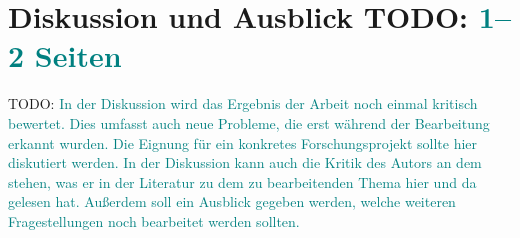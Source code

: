 \documentclass[headsepline,titlepage,ngerman,twoside,12pt]{report}
\newcommand\todo[1]{TODO: \textcolor{teal}{#1}}
\begin{document}
\chapter{Diskussion und Ausblick \todo{1--2 Seiten}}
\todo{
In der Diskussion wird das Ergebnis der Arbeit noch einmal kritisch bewertet.
Dies umfasst auch neue Probleme, die erst während der Bearbeitung erkannt wurden.
Die Eignung für ein konkretes Forschungsprojekt sollte hier diskutiert werden.
In der Diskussion kann auch die Kritik des Autors an dem stehen, was er in der Literatur zu dem zu bearbeitenden Thema hier und da gelesen hat.
Außerdem soll ein Ausblick gegeben werden, welche weiteren Fragestellungen noch bearbeitet werden sollten.
}

\renewcommand{\bibpreamble}{
\todo{
Zentrale Literatur, die den untersuchten Artikeln zugrunde liegt, können Sie im bibtex-Format in die seminar.bib einfügen und dann im Text zitieren, wodurch diese automatisch in das Literaturverzeichnis übernommen werden.
Sie können auch weitere referierte Veröffentlichungen (wissenschaftliche Zeitschriften (auch elektronisch), Bücher) in die Erarbeitung einbeziehen zitieren.
Sie können dafür Literaturdatenbanken wie Pubmed oder Google Scholar durchsuchen und dort direkt als bibtex-Eintrag herunterladen.
Bitte beachten Sie, dass die \href{https://www.openoffice.org/bibliographic/bibtex-defs.html}{bibtex-Einträge vollständig sind}, z.B. sind das bei Büchern Autor, Editor, Title, Kapitel oder Seiten, Herausgeber und Jahr..
Weitere Informationen zum Thema der Literaturrecherche finden sich in den \href{http://www.imise.uni-leipzig.de/Lehre/MedInf/Abschlussarbeiten/Literaturrecherche.jsp}{Hinweisen zur Literaturrecherche}.
\paragraph{Beispielzitierungen}
\citet{his} beschreiben ein Verfahren zur X von Y auf Basis von Z.
Alternativ: X von Y lässt sich auf Basis von Z ermitteln~\citep{his}.
}
}



\end{document}
